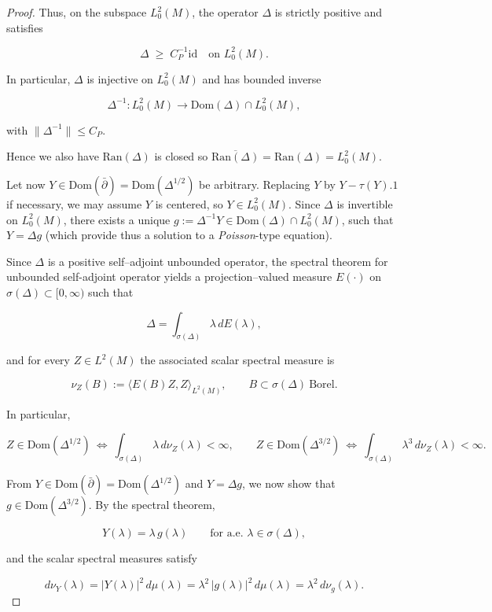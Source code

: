 \documentclass[10pt,a4paper,reqno]{amsart}
\newcommand{\Dom}{\mathrm{Dom}}
\begin{document}
\begin{proof}
Thus, on the subspace $L^2_0(M)$, the operator
$\Delta$ is strictly positive and satisfies


\[
\Delta \;\ge\; C_P^{-1} \mathrm{id}
\quad\text{on }L^2_0(M).
\]


In particular, $\Delta$ is injective on $L^2_0(M)$ and has bounded inverse


\[
\Delta^{-1}:L^2_0(M)\to \Dom(\Delta)\cap L^2_0(M),
\]


with $\|\Delta^{-1}\|\le C_P$.

Hence we also have ${\mathrm{Ran}(\Delta)}$ is closed so $\overline{\mathrm{Ran}(\Delta)}={\mathrm{Ran}(\Delta)}=L_0^2(M)$.
\bigskip

Let now $Y\in \Dom(\bar\partial)=\Dom(\Delta^{1/2})$ be arbitrary. Replacing $Y$ by
$Y-\tau(Y).1$ if necessary, we may assume $Y$ is centered, so $Y\in L^2_0(M)$.
Since $\Delta$ is invertible on $L^2_0(M)$, there exists a unique $g := \Delta^{-1}Y \in \Dom(\Delta)\cap L^2_0(M)$, such that $Y = \Delta g$ (which provide thus a solution to a \emph{Poisson}-type equation).


\bigskip
Since $\Delta$ is a positive self–adjoint unbounded operator,  the
spectral theorem for unbounded self-adjoint operator yields a projection–valued measure $E(\cdot)$ on $\sigma(\Delta)\subset[0,\infty)$ such that


\[
\Delta=\int_{\sigma(\Delta)} \lambda\,dE(\lambda),
\]


and for every $Z\in L^2(M)$ the associated scalar spectral measure is


\[
\nu_Z(B):=\langle E(B)Z,Z\rangle_{L^2(M)},\qquad B\subset\sigma(\Delta)\ \text{Borel}.
\]


In particular,


\[
Z\in \Dom(\Delta^{1/2})
\ \Longleftrightarrow\
\int_{\sigma(\Delta)} \lambda\,d\nu_Z(\lambda)<\infty,\qquad
Z\in \Dom(\Delta^{3/2})
\ \Longleftrightarrow\
\int_{\sigma(\Delta)} \lambda^3\,d\nu_Z(\lambda)<\infty.
\]



From $Y\in \Dom(\bar\partial)=\Dom(\Delta^{1/2})$ and $Y=\Delta g$, we now show that
$g\in \Dom(\Delta^{3/2})$. By the spectral theorem,


\[
Y(\lambda)=\lambda\,g(\lambda)\qquad\text{for a.e.\ }\lambda\in\sigma(\Delta),
\]


and the scalar spectral measures satisfy


\[
d\nu_Y(\lambda)=|Y(\lambda)|^2\,d\mu(\lambda)
=\lambda^2\,|g(\lambda)|^2\,d\mu(\lambda)
=\lambda^2\,d\nu_g(\lambda).
\]



\end{proof}
\end{document}
